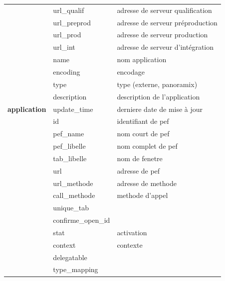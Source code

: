 \begin{longtable}[c]{|c|l|l|}
	& url\_qualif              & adresse de serveur qualification  \\ \cline{2-3} 
	& url\_preprod             & adresse de serveur préproduction  \\ \cline{2-3} 
	& url\_prod                & adresse de serveur production     \\ \cline{2-3} 
	& url\_int                 & adresse de serveur d'intégration  \\ \cline{2-3} 
	& name                     & nom application                   \\ \cline{2-3} 
	& encoding                 & encodage                          \\ \cline{2-3} 
	& type                     & type (externe, panoramix)         \\ \cline{2-3} 
	& description              & description de l'application      \\ \cline{2-3} 
	\multirow{-12}{*}{\textbf{application}}                & update\_time & derniere date de mise à jour        \\ \hline
	& id                       & identifiant de pef                \\ \cline{2-3} 
	& pef\_name                & nom court de pef                  \\ \cline{2-3} 
	& pef\_libelle             & nom complet de pef                \\ \cline{2-3} 
	& tab\_libelle             & nom de fenetre                    \\ \cline{2-3} 
	& url                      & adresse de pef                    \\ \cline{2-3} 
	& url\_methode             & adresse de methode                \\ \cline{2-3} 
	& call\_methode            & methode d'appel                   \\ \cline{2-3} 
	& unique\_tab              &                                   \\ \cline{2-3} 
	& confirme\_open\_id       &                                   \\ \cline{2-3} 
	& stat                     & activation                        \\ \cline{2-3} 
	& context                  & contexte                          \\ \cline{2-3} 
	& delegatable              &                                   \\ \cline{2-3} 
	& type\_mapping            &                                   \\ \cline{2-3} 

\end{longtable}

